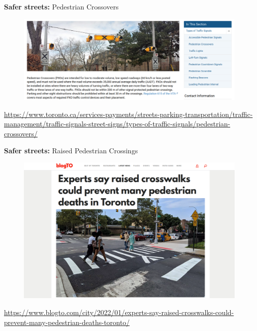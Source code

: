 \documentclass[aspectratio=169]{beamer}
\begin{document}


\begin{frame}
	
	\textbf{Safer streets:} Pedestrian Crossovers
	
	\begin{figure}
		\centering
		\includegraphics[width=1\linewidth]{images/pedestrian_pxo.png}
	\end{figure}
	
	\tiny\url{https://www.toronto.ca/services-payments/streets-parking-transportation/traffic-management/traffic-signals-street-signs/types-of-traffic-signals/pedestrian-crossovers/}
	
	
\end{frame}



\begin{frame}
	
	\textbf{Safer streets:} Raised Pedestrian Crossings
	
	\begin{figure}
		\centering
		\includegraphics[width=0.8\linewidth]{images/raised_crossings.png}
	\end{figure}
	
	\tiny\url{https://www.blogto.com/city/2022/01/experts-say-raised-crosswalks-could-prevent-many-pedestrian-deaths-toronto/}
	
	
\end{frame}
\end{document}
